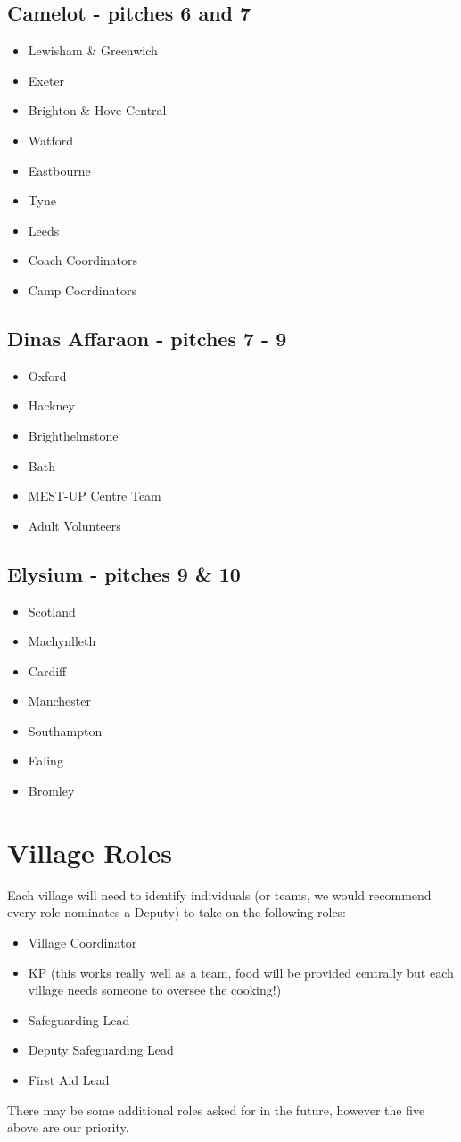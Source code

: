 \documentclass[a4paper, 11pt]{report}
\newcommand{\nl}{\newline}
\begin{document}
\subsection{Camelot - pitches 6 and 7}
\begin{itemize}
    \item Lewisham \& Greenwich
    \item Exeter
    \item Brighton \& Hove Central
    \item Watford
    \item Eastbourne
    \item Tyne
    \item Leeds
    \item Coach Coordinators
    \item Camp Coordinators
\end{itemize}
\subsection{Dinas Affaraon - pitches 7 - 9}
\begin{itemize}
    \item Oxford
    \item Hackney
    \item Brighthelmstone
    \item Bath
    \item MEST-UP Centre Team
    \item Adult Volunteers
\end{itemize}
\subsection{Elysium - pitches 9 \& 10}
\begin{itemize}
    \item Scotland
    \item Machynlleth
    \item Cardiff
    \item Manchester
    \item Southampton
    \item Ealing
    \item Bromley
\end{itemize}

\section{Village Roles}
Each village will need to identify individuals (or teams, we would recommend every role nominates a Deputy) to take on the following roles:
\begin{itemize}
    \item Village Coordinator
    \item KP (this works really well as a team, food will be provided centrally but each village needs someone to oversee the cooking!)
    \item Safeguarding Lead
    \item Deputy Safeguarding Lead
    \item First Aid Lead
\end{itemize}
There may be some additional roles asked for in the future, however the five above are our priority.\nl
\end{document}
